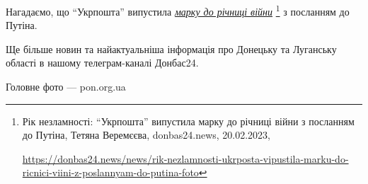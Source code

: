 Нагадаємо, що \enquote{Укрпошта} випустила \href{https://donbas24.news/news/rik-nezlamnosti-ukrposta-vipustila-marku-do-ricnici-viini-z-poslannyam-do-putina-foto}{\emph{марку до річниці війни}}%
\footnote{Рік незламності: \enquote{Укрпошта} випустила марку до річниці війни з посланням до Путіна, Тетяна Веремєєва, donbas24.news, 20.02.2023, \par\url{https://donbas24.news/news/rik-nezlamnosti-ukrposta-vipustila-marku-do-ricnici-viini-z-poslannyam-do-putina-foto}} з посланням до Путіна.

Ще більше новин та найактуальніша інформація про Донецьку та Луганську області
в нашому телеграм-каналі Донбас24.

Головне фото — pon.org.ua

